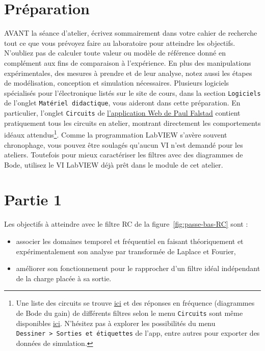 \documentclass[canadien,12pt,oneside,letterpaper]{article}
\begin{document}
\section{Préparation}\label{sec:prep}
\vspace{-3ex}
AVANT la séance d'atelier, écrivez sommairement dans votre cahier de recherche tout ce que vous prévoyez faire au laboratoire pour atteindre les objectifs. N'oubliez pas de calculer toute valeur ou modèle de référence donné en complément aux fins de comparaison à l'expérience. En plus des manipulations expérimentales, des mesures à prendre et de leur analyse, notez aussi les étapes de modélisation, conception et simulation nécessaires. Plusieurs logiciels spécialisés pour l'électronique listés sur le site de cours, dans la section \texttt{Logiciels} de l'onglet \texttt{Matériel didactique}, vous aideront dans cette préparation. En particulier, l'onglet \texttt{Circuits} de \href{https://www.falstad.com/circuit/}{l'application Web de Paul Falstad} contient pratiquement tous les circuits en atelier, montrant directement les comportements idéaux attendus\footnote{Une liste des circuits se trouve \href{https://www.falstad.com/circuit/directions.html}{ici} et des réponses en fréquence (diagrammes de Bode du gain) de différents filtres selon le menu \texttt{Circuits} sont même disponibles \href{https://www.falstad.com/afilter/}{ici}. N'hésitez pas à explorer les possibilités du menu \texttt{Dessiner~>~Sorties et étiquettes} de l'app, entre autres pour exporter des données de simulation.}. Comme la programmation LabVIEW s'avère souvent chronophage, vous pouvez être soulagés qu'aucun VI n'est demandé pour les ateliers. Toutefois pour mieux caractériser les filtres avec des diagrammes de Bode, utilisez le VI LabVIEW déjà prêt dans le module de cet atelier.

\section{Partie 1}\label{sec:analyseRC}
Les objectifs à atteindre avec le filtre RC de la figure~\ref{fig:passe-bas-RC} sont :

\begin{itemize}
    \item associer les domaines temporel et fréquentiel en faisant théoriquement et expérimentalement son analyse par transformée de Laplace et Fourier,
    \item améliorer son fonctionnement pour le rapprocher d'un filtre idéal indépendant de la charge placée à sa sortie.
\end{itemize}
\end{document}

